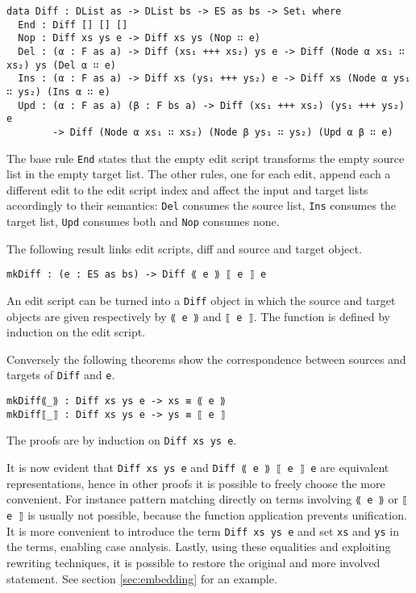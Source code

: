 \documentclass[../Thesis.tex]{subfiles}
\begin{document}
	\begin{verbatim}
data Diff : DList as -> DList bs -> ES as bs -> Set₁ where
  End : Diff [] [] []
  Nop : Diff xs ys e -> Diff xs ys (Nop ∷ e)
  Del : (α : F as a) -> Diff (xs₁ +++ xs₂) ys e -> Diff (Node α xs₁ ∷ xs₂) ys (Del α ∷ e)
  Ins : (α : F as a) -> Diff xs (ys₁ +++ ys₂) e -> Diff xs (Node α ys₁ ∷ ys₂) (Ins α ∷ e)
  Upd : (α : F as a) (β : F bs a) -> Diff (xs₁ +++ xs₂) (ys₁ +++ ys₂) e 
        -> Diff (Node α xs₁ ∷ xs₂) (Node β ys₁ ∷ ys₂) (Upd α β ∷ e)
\end{verbatim}

	The base rule \texttt{End} states that the empty edit script 
	transforms the empty source list in the empty target list.
	The other rules, one for each edit, append each a different edit 
	to the edit script 	index and affect the input and target lists 
	accordingly to their 	semantics: 
	\texttt{Del} consumes the source list, \texttt{Ins} consumes the target list, 
	\texttt{Upd} consumes both and \texttt{Nop} consumes none.	

	The following result links edit scripts, diff and source and target object.
	
\begin{verbatim}	
mkDiff : (e : ES as bs) -> Diff ⟪ e ⟫ ⟦ e ⟧ e
\end{verbatim}

	An edit script can be turned into a \texttt{Diff} object in which the
	source and target objects are given respectively by \texttt{⟪ e ⟫} and 
	\texttt{⟦ e ⟧}.
	The function is defined by induction on the edit script.
	
	Conversely the following theorems show the correspondence
	between sources and targets of \texttt{Diff} and \texttt{e}. 

\begin{verbatim}
mkDiff⟪_⟫ : Diff xs ys e -> xs ≡ ⟪ e ⟫
mkDiff⟦_⟧ : Diff xs ys e -> ys ≡ ⟦ e ⟧
\end{verbatim}

	The proofs are by induction on \texttt{Diff xs ys e}.
	
	It is now evident that \texttt{Diff xs ys e} and \texttt{Diff  ⟪ e ⟫ ⟦ e ⟧ e} 
	are equivalent	representations, hence in other proofs it is possible to freely 
	choose the more convenient. 
	For instance pattern matching directly on terms involving \texttt{⟪ e ⟫} or
	\texttt{⟦ e ⟧}	is usually not possible, because the function application
	prevents unification. It is more convenient to introduce the term
	\texttt{Diff xs ys e} and set \texttt{xs} and \texttt{ys} in the terms, 
	enabling case analysis. Lastly, using 
	these equalities and exploiting rewriting techniques, it is possible
	to restore the original and more involved statement.
	See section \ref{sec:embedding} for an example.
	
\end{document}
